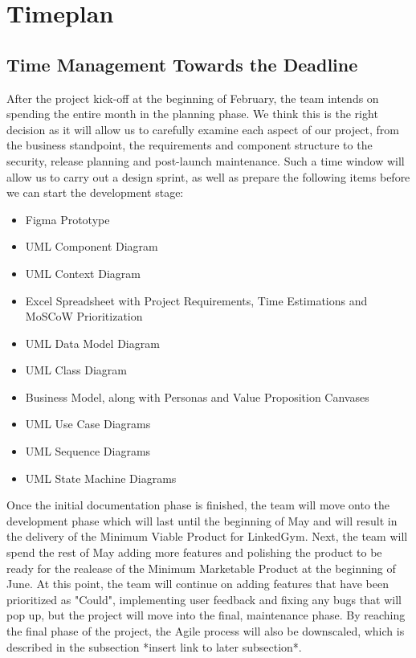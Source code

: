 \section{Timeplan}

\subsection{Time Management Towards the Deadline}

After the project kick-off at the beginning of February, the team intends on spending the entire month in the planning phase. We think
this is the right decision as it will allow us to carefully examine each aspect of our project, from the business standpoint, the requirements
and component structure to the security, release planning and post-launch maintenance. Such a time window will allow us to carry out a design sprint,
as well as prepare the following items before we can start the development stage:
\begin{itemize}
    \item Figma Prototype
    \item UML Component Diagram
    \item UML Context Diagram
    \item Excel Spreadsheet with Project Requirements, Time Estimations and MoSCoW Prioritization
    \item UML Data Model Diagram
    \item UML Class Diagram
    \item Business Model, along with Personas and Value Proposition Canvases
    \item UML Use Case Diagrams
    \item UML Sequence Diagrams
    \item UML State Machine Diagrams
\end{itemize}

Once the initial documentation phase is finished, the team will move onto the development phase which will last until the beginning
of May and will result in the delivery of the Minimum Viable Product for LinkedGym. Next, the team will spend the rest of May adding more features and polishing
the product to be ready for the realease of the Minimum Marketable Product at the beginning of June. At this point, the team will continue on adding features 
that have been prioritized as "Could", implementing user feedback and fixing any bugs that will pop up, but the project will move into the final, maintenance phase.
By reaching the final phase of the project, the Agile process will also be downscaled, which is described in the subsection *insert link to later subsection*.

